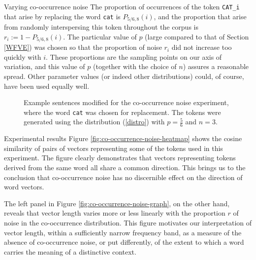 \documentclass{article} %
\newcommand{\word}[1]{\texttt{#1}}
\begin{document}
\begin{section}{Varying co-occurrence noise}
The proportion of occurrences of the token \word{CAT\_i} that arise by
replacing the word \word{cat} is $P_{5/6, 8}(i)$, and the proportion
that arise from randomly interspersing this token throughout the corpus
is $r_i := 1 - P_{5/6, 8}(i)$.  The particular value of $p$ (large
compared to that of Section \ref{WFVE}) was chosen so that the
proportion of noise $r_i$ did not increase too quickly with $i$.  These
proportions are the sampling points on our axis of variation, and this
value of $p$ (together with the choice of $n$) assures a reasonable
spread.  Other parameter values (or indeed other distributions) could,
of course, have been used equally well.

\begin{table}
	
	\label{fig:co-occurrence-noise-counts}
	\caption{Words chosen for the co-occurrence noise experiment, along with the occurrence counts in the unmodified corpus. }
	\label{cooccurrence-noise-words}
\end{table}

\begin{figure}
	\begin{mdframed}
	
	\end{mdframed}
	\caption{Example sentences modified for the co-occurrence noise
          experiment, where the word \word{cat} was chosen for
          replacement.  The tokens were generated using the distribution
          (\ref{distro}) with $p = \tfrac{5}{6}$ and $n=3$.}
	\label{fig:co-occurrence-noise-experiment-text}
\end{figure}

\begin{subsection}{Experimental results}
Figure \ref{fig:co-occurrence-noise-heatmap} shows the cosine similarity
of pairs of vectors representing some of the tokens used in this
experiment.  The figure clearly demonstrates that vectors representing
tokens derived from the same word all share a common direction.  This
brings us to the conclusion that co-occurrence noise has no discernible effect on
the direction of word vectors.


The left panel in Figure \ref{fig:co-occurrence-noise-graph}, on the other hand, reveals that vector length varies more or less
linearly with the proportion $r$ of noise in the co-occurrence
distribution.  This figure motivates our interpretation of vector
length, within a sufficiently narrow frequency band, as a measure of the
absence of co-occurrence noise, or put differently, of the extent to
which a word carries the meaning of a distinctive context.


\end{subsection}
\end{section}
\end{document}
